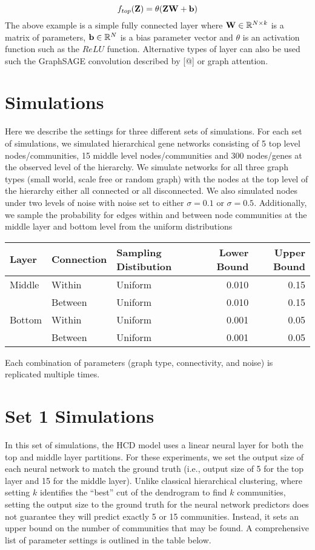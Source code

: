 \documentclass[
]{article}
\begin{document}
\[f_{top}({\bf Z}) = \theta({\bf ZW} + {\bf b})\] The above example is a
simple fully connected layer where
\({\bf W} \in \mathbb{R}^{N \times k}\) is a matrix of parameters,
\({\bf b} \in \mathbb{R}^N\) is a bias parameter vector and \(\theta\)
is an activation function such as the \(ReLU\) function. Alternative
types of layer can also be used such the GraphSAGE convolution described
by {[}@{]} or graph attention.

\section{Simulations}\label{simulations}

Here we describe the settings for three different sets of simulations.
For each set of simulations, we simulated hierarchical gene networks
consisting of 5 top level nodes/communities, 15 middle level
nodes/communities and 300 nodes/genes at the observed level of the
hierarchy. We simulate networks for all three graph types (small world,
scale free or random graph) with the nodes at the top level of the
hierarchy either all connected or all disconnected. We also simulated
nodes under two levels of noise with noise set to either
\(\sigma = 0.1\) or \(\sigma = 0.5\). Additionally, we sample the
probability for edges within and between node communities at the middle
layer and bottom level from the uniform distributions

\begin{tabular}{lllrr}
\toprule
Layer & Connection & Sampling Distibution & Lower Bound & Upper Bound\\
\midrule
Middle & Within & Uniform & 0.010 & 0.15\\
 & Between & Uniform & 0.010 & 0.15\\
Bottom & Within & Uniform & 0.001 & 0.05\\
 & Between & Uniform & 0.001 & 0.05\\
\bottomrule
\end{tabular}

Each combination of parameters (graph type, connectivity, and noise) is
replicated multiple times.

\section{Set 1 Simulations}\label{set-1-simulations}

In this set of simulations, the HCD model uses a linear neural layer for
both the top and middle layer partitions. For these experiments, we set
the output size of each neural network to match the ground truth (i.e.,
output size of 5 for the top layer and 15 for the middle layer). Unlike
classical hierarchical clustering, where setting \(k\) identifies the
``best'' cut of the dendrogram to find \(k\) communities, setting the
output size to the ground truth for the neural network predictors does
not guarantee they will predict exactly 5 or 15 communities. Instead, it
sets an upper bound on the number of communities that may be found. A
comprehensive list of parameter settings is outlined in the table below.
\end{document}
